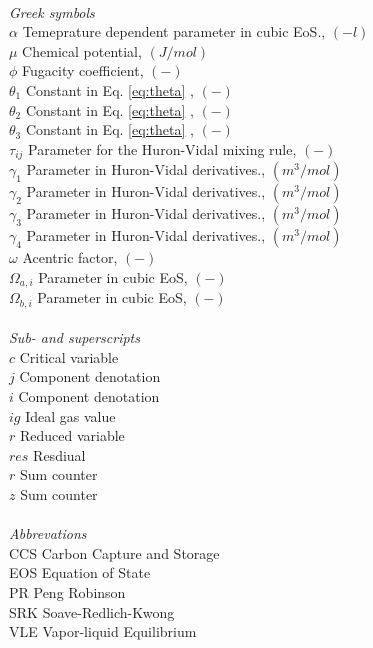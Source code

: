 \begin{tabbing}
\\ \textit{Greek symbols}\\
$\alpha$ \> Temeprature dependent parameter in cubic EoS., $(-l)$\\
$\mu$ \> Chemical potential, $(J/mol)$\\
$\phi$ \> Fugacity coefficient, $(-)$\\
$\theta_1$ \> Constant in Eq. \ref{eq:theta} , $(-)$\\
$\theta_2$ \> Constant in Eq. \ref{eq:theta} , $(-)$\\
$\theta_3$ \> Constant in Eq. \ref{eq:theta} , $(-)$\\
$\tau_{ij}$ \> Parameter for the Huron-Vidal mixing rule, $(-)$\\
$\gamma_1$ \> Parameter in Huron-Vidal derivatives., $(m^3/mol)$\\
$\gamma_2$ \> Parameter in Huron-Vidal derivatives., $(m^3/mol)$\\
$\gamma_3$ \> Parameter in Huron-Vidal derivatives., $(m^3/mol)$\\
$\gamma_4$ \> Parameter in Huron-Vidal derivatives., $(m^3/mol)$\\
$\omega$ \> Acentric factor, $(-)$\\
$\Omega_{a,i}$ \> Parameter in cubic EoS, $(-)$\\
$\Omega_{b,i}$ \> Parameter in cubic EoS, $(-)$\\
\\

\textit{Sub- and superscripts}\\
$c$ \> Critical variable \\
$j$ \> Component denotation \\
$i$ \> Component denotation \\
$ig$ \> Ideal gas value \\
$r$ \> Reduced variable \\
$res$ \> Resdiual \\
$r$ \> Sum counter \\
$z$ \> Sum counter \\


\\
\textit{Abbrevations}\\
CCS \> Carbon Capture and Storage	\\
EOS \> Equation of State	\\
PR \> Peng Robinson	\\
SRK \> Soave-Redlich-Kwong	\\
VLE \> Vapor-liquid Equilibrium	\\
 \end{tabbing}

